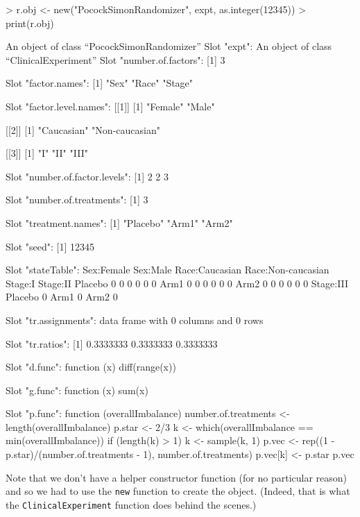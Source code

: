 \documentclass[11pt, letter]{article}
\numberwithin{equation}{section}
\begin{document}
\begin{Schunk}
\begin{Sinput}
> r.obj <- new("PocockSimonRandomizer", expt, as.integer(12345))
> print(r.obj)
\end{Sinput}
\begin{Soutput}
An object of class “PocockSimonRandomizer”
Slot "expt":
An object of class “ClinicalExperiment”
Slot "number.of.factors":
[1] 3

Slot "factor.names":
[1] "Sex"   "Race"  "Stage"

Slot "factor.level.names":
[[1]]
[1] "Female" "Male"  

[[2]]
[1] "Caucasian"     "Non-caucasian"

[[3]]
[1] "I"   "II"  "III"


Slot "number.of.factor.levels":
[1] 2 2 3

Slot "number.of.treatments":
[1] 3

Slot "treatment.names":
[1] "Placebo" "Arm1"    "Arm2"   


Slot "seed":
[1] 12345

Slot "stateTable":
        Sex:Female Sex:Male Race:Caucasian Race:Non-caucasian Stage:I Stage:II
Placebo          0        0              0                  0       0        0
Arm1             0        0              0                  0       0        0
Arm2             0        0              0                  0       0        0
        Stage:III
Placebo         0
Arm1            0
Arm2            0

Slot "tr.assignments":
data frame with 0 columns and 0 rows

Slot "tr.ratios":
[1] 0.3333333 0.3333333 0.3333333

Slot "d.func":
function (x) 
{
    diff(range(x))
}

Slot "g.func":
function (x) 
{
    sum(x)
}

Slot "p.func":
function (overallImbalance) 
{
    number.of.treatments <- length(overallImbalance)
    p.star <- 2/3
    k <- which(overallImbalance == min(overallImbalance))
    if (length(k) > 1) {
        k <- sample(k, 1)
    }
    p.vec <- rep((1 - p.star)/(number.of.treatments - 1), number.of.treatments)
    p.vec[k] <- p.star
    p.vec
}
\end{Soutput}
\end{Schunk}

Note that we don't have a helper constructor function (for no
particular reason) and so we had to use the \texttt{new} function to
create the object. (Indeed, that is what the
\texttt{ClinicalExperiment} function does behind the scenes.)
 
\end{document}
